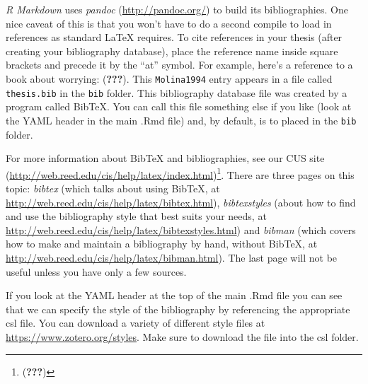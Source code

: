 \documentclass[12pt,twoside]{reedthesis}
\begin{document}
\emph{R Markdown} uses \emph{pandoc} (\url{http://pandoc.org/}) to build its bibliographies. One nice caveat of this is that you won't have to do a second compile to load in references as standard LaTeX requires. To cite references in your thesis (after creating your bibliography database), place the reference name inside square brackets and precede it by the ``at'' symbol. For example, here's a reference to a book about worrying: ({\textbf{???}}). This \texttt{Molina1994} entry appears in a file called \texttt{thesis.bib} in the \texttt{bib} folder. This bibliography database file was created by a program called BibTeX. You can call this file something else if you like (look at the YAML header in the main .Rmd file) and, by default, is to placed in the \texttt{bib} folder.

For more information about BibTeX and bibliographies, see our CUS site (\url{http://web.reed.edu/cis/help/latex/index.html})\footnote{({\textbf{???}})}. There are three pages on this topic: \emph{bibtex} (which talks about using BibTeX, at \url{http://web.reed.edu/cis/help/latex/bibtex.html}), \emph{bibtexstyles} (about how to find and use the bibliography style that best suits your needs, at \url{http://web.reed.edu/cis/help/latex/bibtexstyles.html}) and \emph{bibman} (which covers how to make and maintain a bibliography by hand, without BibTeX, at \url{http://web.reed.edu/cis/help/latex/bibman.html}). The last page will not be useful unless you have only a few sources.

If you look at the YAML header at the top of the main .Rmd file you can see that we can specify the style of the bibliography by referencing the appropriate csl file. You can download a variety of different style files at \url{https://www.zotero.org/styles}. Make sure to download the file into the csl folder.
\end{document}
